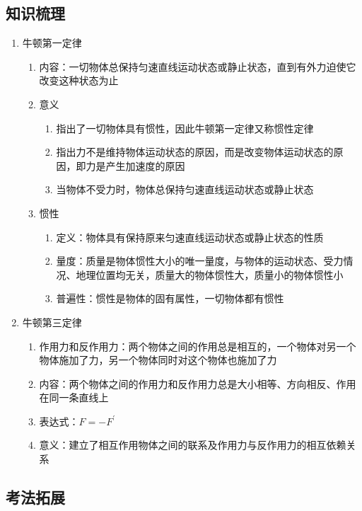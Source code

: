 \documentclass[cn,11pt]{elegantbook}
\begin{document}
      \subsection{知识梳理}
      \begin{enumerate}
         \item 牛顿第一定律
         \begin{enumerate}
            \item 内容：一切物体总保持匀速直线运动状态或静止状态，直到有外力迫使它改变这种状态为止
            \item 意义
            \begin{enumerate}
               \item 指出了一切物体具有惯性，因此牛顿第一定律又称惯性定律
               \item 指出力不是维持物体运动状态的原因，而是改变物体运动状态的原因，即力是产生加速度的原因
               \item 当物体不受力时，物体总保持匀速直线运动状态或静止状态
            \end{enumerate}
            \item 惯性
            \begin{enumerate}
               \item 定义：物体具有保持原来匀速直线运动状态或静止状态的性质
               \item 量度：质量是物体惯性大小的唯一量度，与物体的运动状态、受力情况、地理位置均无关，质量大的物体惯性大，质量小的物体惯性小
               \item 普遍性：惯性是物体的固有属性，一切物体都有惯性
            \end{enumerate}
         \end{enumerate}
         \item 牛顿第三定律
         \begin{enumerate}
            \item 作用力和反作用力：两个物体之间的作用总是相互的，一个物体对另一个物体施加了力，另一个物体同时对这个物体也施加了力
            \item 内容：两个物体之间的作用力和反作用力总是大小相等、方向相反、作用在同一条直线上
            \item 表达式：$F=-F^{\prime}$
            \item 意义：建立了相互作用物体之间的联系及作用力与反作用力的相互依赖关系
         \end{enumerate}
      \end{enumerate}
      \subsection{考法拓展}
\end{document}
